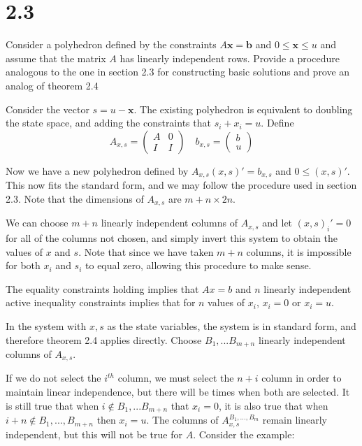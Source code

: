 \documentclass[12pt]{paper}
\begin{document}
\section{2.3}


Consider a polyhedron defined by the constraints $A \bm{x} = \bm{b}$
and $0 \leq \bm{x} \leq u$ and assume that the matrix $A$ has linearly
independent rows. Provide a procedure analogous to the one in section
2.3 for constructing basic solutions and prove an analog of theorem
2.4

\vspace{.3in}

Consider the vector $s = u - \bm{x}$. The existing polyhedron is
equivalent to doubling the state space, and adding the constraints
that $s_i + x_i = u$. Define
\begin{equation*}
  A_{x,s} =
  \begin{pmatrix}
    A & 0\\
    I & I
  \end{pmatrix}
  \quad b_{x,s} =
  \begin{pmatrix}
    b\\
    u
  \end{pmatrix}
\end{equation*}

Now we have a new polyhedron defined by $A_{x,s} (x,s)' = b_{x,s}$ and
$0 \leq (x,s)'$. This now fits the standard form, and we may follow the
procedure used in section 2.3. Note that the dimensions of $A_{x,s}$
are $m + n \times 2n$.

We can choose $m+n$ linearly independent columns of $A_{x,s}$ and let
$(x,s)_i' = 0$ for all of the columns not chosen, and simply invert
this system to obtain the values of $x$ and $s$. Note that since we
have taken $m+n$ columns, it is impossible for both $x_i$ and $s_i$ to
equal zero, allowing this procedure to make sense.

The equality constraints holding implies that $Ax = b$ and $n$
linearly independent active inequality constraints implies that for
$n$ values of $x_i$, $x_i = 0$ or $x_i = u$. 

In the system with $x,s$ as the state variables, the system is in
standard form, and therefore theorem 2.4 applies directly. Choose
$B_1,...B_{m+n}$ linearly independent columns of $A_{x,s}$.

If we do not select the $i^{th}$ column, we must select the $n+i$
column in order to maintain linear independence, but there will be
times when both are selected. It is still true that when $i \notin
B_1,...B_{m+n}$ that $x_i = 0$, it is also true that when $i+n \notin B_1, ...,
B_{m+n}$ then $x_i = u$. The columns of $A_{x,s}^{B_1,...,B_m}$ remain linearly
independent, but this will not be true for $A$. Consider the example:
\end{document}

